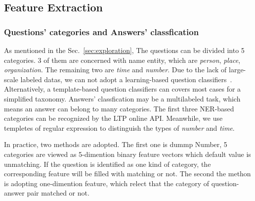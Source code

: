 \documentclass{llncs}
\begin{document}
\subsection{Feature Extraction}
\label{sec:feature}

\subsubsection{Questions' categories and Answers’ classfication}

As mentioned in the Sec.~\ref{sec:exploration}, 
The questions can be divided into 5 categories. 3 of them are concerned with name entity, which are \emph{person}, \emph{place}, \emph{organization}. The  remaining two are \emph{time} and \emph{number}. Due to the lack of large-scale labeled datas, we can not adopt a learning-based question classifiers~\cite{Li2003Learning}. Alternatively, a template-based question classifiers can covers most cases for a simplified taxonomy. 
Answers' classfication may be a multilabeled task, which means an answer can belong to many categories. The first three NER-based categories can be recognized by the LTP online API. Meanwhile, we use templetes  of regular expression to distinguish the types of \emph{number} and \emph{time}. 

In practice, two methods are adopted. The first one is dummp Number, 5 categories are viewed as 5-dimention binary feature vectors which default value is unmatching. If the question is identified as one kind of category, the corresponding feature will be filled with matching or not. 
The second the methon is adopting one-dimention feature, which relect that the category of question-answer pair matched or not.
\end{document}
